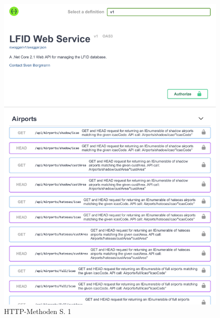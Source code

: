 	\begin{figure}[htp]
		\centering
		\caption{HTTP-Methoden S. 1\label{fig:http-methoden-S1}}
		\includegraphics[page=1,width=.9\textwidth]{include/img/SwaggerUI}
	\end{figure}

